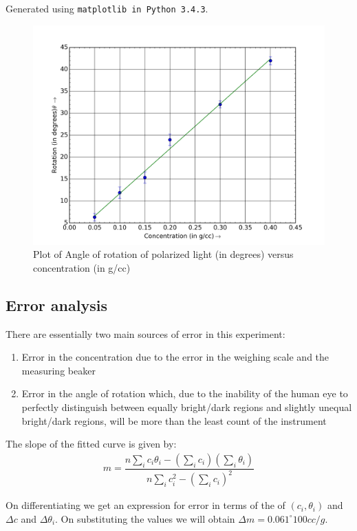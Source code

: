 \documentclass{dkpinto-report}
\begin{document}
Generated using \texttt{matplotlib in Python 3.4.3}.
\begin{figure}[H]
\centering
\includegraphics[scale=0.7]{Images/Plot.png}
\caption{Plot of Angle of rotation of polarized light (in degrees) versus concentration (in g/cc)} 
\end{figure}


\subsection{Error analysis}
There are essentially two main sources of error in this experiment:
\begin{enumerate}
\item Error in the concentration due to the error in the weighing scale and the measuring beaker
\item Error in the angle of rotation which, due to the inability of the human eye to perfectly distinguish between equally bright/dark regions and slightly unequal bright/dark regions, will be more than the least count of the instrument
\end{enumerate} 

The slope of the fitted curve is given by:
\begin{align*}
m = \dfrac{n\sum_i c_i \theta_i - (\sum_i c_i)(\sum_i \theta_i)}{n\sum_i c_{i}^{2} -  (\sum_i c_i)^2}
\end{align*}

On differentiating we get an expression for error in terms of the of $(c_i, \theta_i)$ and $\Delta c$ and $\Delta \theta_i$. On substituting the values we will obtain $\Delta m = 0.061 ^{\circ} 100 cc / g$. 
\end{document}
